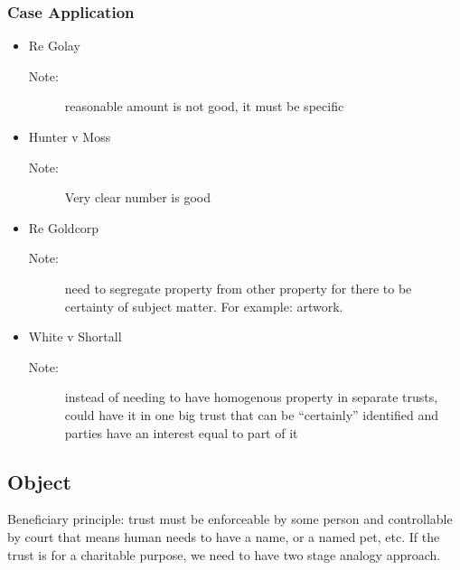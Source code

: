 \subsubsection*{Case Application}
\begin{itemize}
    \item Re Golay
        \begin{description}
            \item[Note:]reasonable amount is not good, it must be specific
        \end{description}
    \item Hunter v Moss
        \begin{description}
            \item[Note:]Very clear number is good 
        \end{description}
    \item Re Goldcorp
        \begin{description}
            \item[Note:] need to segregate property from other property for there to be certainty of subject matter. For example: artwork.
        \end{description}
    \item White v Shortall
        \begin{description}
            \item[Note:] instead of needing to have homogenous property in separate trusts, could have it in one big trust that can be “certainly” identified and parties have an interest equal to part of it
        \end{description}
\end{itemize}

\subsection*{Object}
Beneficiary principle: trust must be enforceable by some person and controllable by court that means human needs to have a name, or a named pet, etc. If the trust is for a charitable purpose, we need to have two stage analogy approach.

